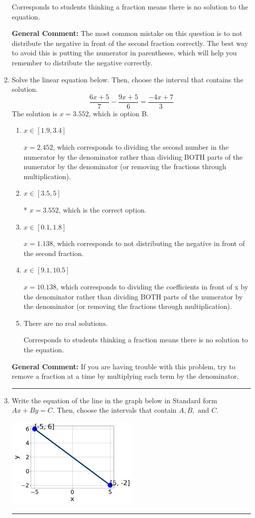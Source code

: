 \documentclass{extbook}[14pt]
\newcommand{\litem}[1]{\item #1

\rule{\textwidth}{0.4pt}}
\begin{document}
\begin{enumerate}
{\begin{enumerate}[label=\Alph*.]
Corresponds to students thinking a fraction means there is no solution to the equation.
\end{enumerate}

\textbf{General Comment:} The most common mistake on this question is to not distribute the negative in front of the second fraction correctly. The best way to avoid this is putting the numerator in parentheses, which will help you remember to distribute the negative correctly.
}
\litem{
Solve the linear equation below. Then, choose the interval that contains the solution.
\[ \frac{6x + 5}{7} - \frac{9x + 5}{6} = \frac{-4x + 7}{3} \]The solution is \( x = 3.552 \), which is option B.\begin{enumerate}[label=\Alph*.]
\item \( x \in [1.9, 3.4] \)

 $x = 2.452$, which corresponds to dividing the second number in the numerator by the denominator rather than dividing BOTH parts of the numerator by the denominator (or removing the fractions through multiplication).
\item \( x \in [3.5, 5] \)

* $x = 3.552$, which is the correct option.
\item \( x \in [0.1, 1.8] \)

 $x = 1.138$, which corresponds to not distributing the negative in front of the second fraction.
\item \( x \in [9.1, 10.5] \)

 $x = 10.138$, which corresponds to dividing the coefficients in front of x by the denominator rather than dividing BOTH parts of the numerator by the denominator (or removing the fractions through multiplication).
\item \( \text{There are no real solutions.} \)

Corresponds to students thinking a fraction means there is no solution to the equation.
\end{enumerate}

\textbf{General Comment:} If you are having trouble with this problem, try to remove a fraction at a time by multiplying each term by the denominator.
}
\litem{
Write the equation of the line in the graph below in Standard form $Ax+By=C$. Then, choose the intervals that contain $A, B, \text{ and } C$.

\begin{center}
    \includegraphics[width=0.5\textwidth]{../Figures/linearGraphToStandardCopyA.png}
\end{center}


}
\end{enumerate}
\end{document}
